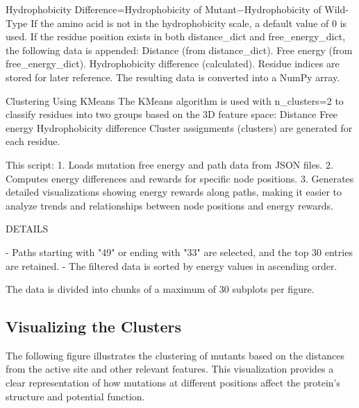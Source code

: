 \documentclass{article}
\begin{document}
Hydrophobicity Difference=Hydrophobicity of Mutant−Hydrophobicity of Wild-Type
If the amino acid is not in the hydrophobicity scale, a default value of 0 is used.
If the residue position exists in both distance_dict and free_energy_dict, the following data is appended:
Distance (from distance_dict).
Free energy (from free_energy_dict).
Hydrophobicity difference (calculated).
Residue indices are stored for later reference.
The resulting data is converted into a NumPy array.

Clustering Using KMeans
The KMeans algorithm is used with n_clusters=2 to classify residues into two groups based on the 3D feature space:
Distance
Free energy
Hydrophobicity difference
Cluster assignments (clusters) are generated for each residue.

This script:
1. Loads mutation free energy and path data from JSON files.
2. Computes energy differences and rewards for specific node positions.
3. Generates detailed visualizations showing energy rewards along paths, making it easier to analyze trends and relationships between node positions and energy rewards.

DETAILS

- Paths starting with "49" or ending with "33" are selected, and the top 30 entries are retained.
- The filtered data is sorted by energy values in ascending order.

The data is divided into chunks of a maximum of 30 subplots per figure.


\subsection{Visualizing the Clusters}

The following figure illustrates the clustering of mutants based on the distances from the active site and other relevant features. This visualization provides a clear representation of how mutations at different positions affect the protein’s structure and potential function.
\end{document}
